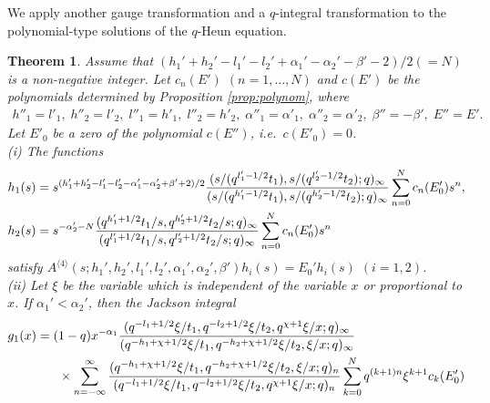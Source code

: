 \documentclass[12pt]{amsart}
\numberwithin{equation}{section}
\newtheorem{thm}{Theorem}[section]
\theoremstyle{definition}
\theoremstyle{remark}
\begin{document}
We apply another gauge transformation and a $q$-integral transformation to the polynomial-type solutions of the $q$-Heun equation.
%
\begin{thm} \label{thm:polynom2gauge}
Assume that $( h_{1}' + h_{2}' -l_{1}' - l_{2}' + \alpha_{1}' - \alpha_{2}' - \beta' - 2)/2 (=N)$ is a non-negative integer.
Let $c_n(E')$ $(n=1,\dots ,N)$ and $c (E')$ be the polynomials determined by Proposition \ref{prop:polynom}, where
\begin{align*}
h''_{1} = l' _1, \; h''_{2} = l' _2, \;  l''_{1} = h' _1, \; l''_{2} = h' _2, \; \alpha ''_{1} = \alpha '_{1} , \; \alpha ''_{2} = \alpha '_{2} , \; \beta '' = -\beta ' , \;  E''=E'.
\end{align*}
Let $E'_0$ be a zero of the polynomial $c (E'') $, i.e.~$c(E'_0 )=0$.
\\
(i) The functions
 \begin{align}
& h_1 (s) = s^{(h_{1}' + h_{2}' - l_{1}' - l_{2}' - \alpha_{1}' - \alpha_{2}' + \beta' + 2)/2 } \frac{(s/(q^{l_{1}' - 1/2}t_{1}), s/(q^{l_{2}' - 1/2}t_{2}); q)_{\infty}}{(s/(q^{h_{1}' - 1/2}t_{1}), s/(q^{h_{2}' - 1/2}t_{2}); q)_{\infty}}  \sum_{n = 0}^{N} c_{n} (E'_0) s^{n} , \label{eq:2h1h2} \\
& h_2 (s) = s^{- \alpha_{2}' -N} \frac{(q^{h_{1}' + 1/2}t_{1}/s, q^{h_{2}' + 1/2}t_{2}/s; q)_{\infty}}{(q^{l_{1}' + 1/2}t_{1}/s, q^{l_{2}' + 1/2}t_{2}/s; q)_{\infty}} \sum_{n = 0}^{N} c_{n} (E'_0) s^{n} \notag
  \end{align}
satisfy $A^{\langle 4 \rangle} (s; h_{1}', h_{2}', l_{1}', l_{2}', \alpha_{1}', \alpha_{2}', \beta') h _i (s) = E_{0}' h_i (s)$ $(i=1,2)$.
\\
(ii) Let $\xi $ be the variable which is independent of the variable $x$ or proportional to $x$.
If $\alpha_{1}' < \alpha_{2}'$, then the Jackson integral
  \begin{align}
    &g _1 (x) = (1 - q) x^{-\alpha_{1}} \frac{(q^{-l_{1} + 1/2}\xi/t_{1}, q^{-l_{2} + 1/2}\xi/t_{2}, q^{\chi + 1}\xi/x; q)_{\infty}}{(q^{-h_{1} + \chi + 1/2}\xi/t_{1}, q^{-h_{2} + \chi + 1/2}\xi/t_{2}, \xi/x; q)_{\infty}} \label{eq:2g1} \\
    &\qquad \qquad \times \sum_{n = -\infty}^{\infty} \frac{(q^{-h_{1} + \chi + 1/2}\xi/t_{1}, q^{-h_{2} + \chi + 1/2}\xi/t_{2}, \xi/x; q)_{n}}{(q^{-l_{1} + 1/2}\xi/t_{1}, q^{-l_{2} + 1/2}\xi/t_{2}, q^{\chi + 1}\xi/x; q)_{n}} \sum_{k = 0}^{N} q^{(k+1)n} \xi^{k+1} c_{k}(E'_0) \notag
  \end{align}

\end{thm}
\end{document}
